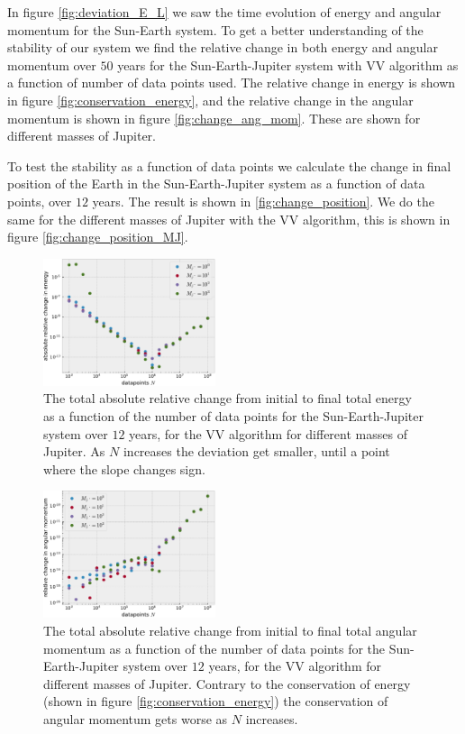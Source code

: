 \documentclass[%
 reprint,
nofootinbib,
aps,
]{revtex4-1}
\begin{document}
In figure \vref{fig:deviation_E_L} we saw the time evolution of energy and angular momentum for the Sun-Earth system. To get a better understanding of the stability of our system we find the relative change in both energy and angular momentum over $50$ years for the Sun-Earth-Jupiter system with VV algorithm as a function of number of data points used. The relative change in energy is shown in figure \vref{fig:conservation_energy}, and the relative change in the angular momentum is shown in figure \vref{fig:change_ang_mom}. These are shown for different masses of Jupiter.

To test the stability as a function of data points we calculate the change in final position of the Earth in the Sun-Earth-Jupiter system as a function of data points, over $12$ years. The result is shown in \vref{fig:change_position}. We do the same for the different masses of Jupiter with the VV algorithm, this is shown in figure \vref{fig:change_position_MJ}.


\begin{figure}
  \centering
  \includegraphics[width=0.45\textwidth]{../figures/conservation_energy2.pdf}
  \caption{The total absolute relative change from initial to final total energy as a function of the number of data points for the Sun-Earth-Jupiter system over $12$ years, for the VV algorithm for different masses of Jupiter. As $N$ increases the deviation get smaller, until a point where the slope changes sign.}
  \label{fig:conservation_energy}
\end{figure}

\begin{figure}
  \centering
  \includegraphics[width=0.45\textwidth]{../figures/conservation_ang_mom_2.pdf}
  \caption{The total absolute relative change from initial to final total angular momentum as a function of the number of data points for the Sun-Earth-Jupiter system over $12$ years, for the VV algorithm for different masses of Jupiter. Contrary to the conservation of energy (shown in figure \vref{fig:conservation_energy}) the conservation of angular momentum gets worse as $N$ increases.}
  \label{fig:change_ang_mom}
\end{figure}
\end{document}
